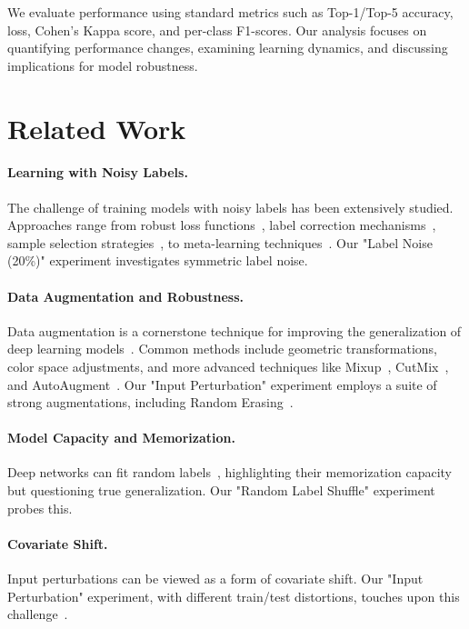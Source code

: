\documentclass[10pt,twocolumn,letterpaper]{article}
\begin{document}
We evaluate performance using standard metrics such as Top-1/Top-5 accuracy, loss, Cohen's Kappa score, and per-class F1-scores. Our analysis focuses on quantifying performance changes, examining learning dynamics, and discussing implications for model robustness.

\section{Related Work}
\label{sec:related}

\paragraph{Learning with Noisy Labels.} The challenge of training models with noisy labels has been extensively studied. Approaches range from robust loss functions~\cite{DBLP:conf/aaai/GhoshKS17,DBLP:conf/nips/ZhangS18}, label correction mechanisms~\cite{DBLP:journals/corr/ReedLASER14}, sample selection strategies~\cite{DBLP:conf/nips/HanYYNXHTS18,DBLP:conf/icml/JiangZLLF18}, to meta-learning techniques~\cite{DBLP:conf/icml/RenZYU18}. Our "Label Noise (20\%)" experiment investigates symmetric label noise.

\paragraph{Data Augmentation and Robustness.} Data augmentation is a cornerstone technique for improving the generalization of deep learning models~\cite{DBLP:journals/jbd/ShortenK19}. Common methods include geometric transformations, color space adjustments, and more advanced techniques like Mixup~\cite{DBLP:conf/iclr/ZhangCDL18}, CutMix~\cite{DBLP:conf/iccv/YunHCOYC19}, and AutoAugment~\cite{Cubuk2019AutoAugmentLA}. Our "Input Perturbation" experiment employs a suite of strong augmentations, including Random Erasing~\cite{DBLP:conf/aaai/Zhong0KL020}.

\paragraph{Model Capacity and Memorization.} Deep networks can fit random labels~\cite{DBLP:journals/corr/ZhangBHRV16}, highlighting their memorization capacity but questioning true generalization. Our "Random Label Shuffle" experiment probes this.

\paragraph{Covariate Shift.} Input perturbations can be viewed as a form of covariate shift. Our "Input Perturbation" experiment, with different train/test distortions, touches upon this challenge~\cite{Patel2015VisualDA}.
\end{document}
